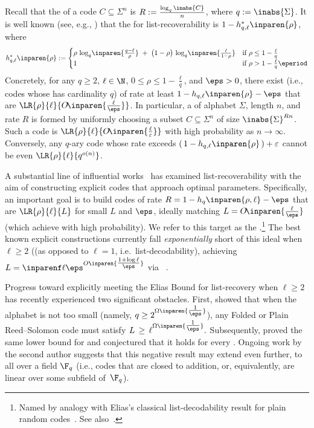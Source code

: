 \documentclass[11pt]{article}
\begin{document}
Recall that the  of a code $C \subseteq \Sigma^n$ is 
$R := \frac{\log_q \inabs{C}}{n}$, where
$q := \inabs{\Sigma}$. It is well known (see, e.g., \cite[Thm.\ 2.4.12]{Resch2020}) that the  for list-recoverability is 
$1 - h^*_{q,\ell}\inparen{\rho}$, where
$$
h^*_{q,\ell}\inparen{\rho}
:= \begin{cases}
\rho\,\log_q\!\inparen{\frac{q-\ell}{\rho}}
\;+\;
\bigl(1-\rho\bigr)\,\log_q\!\inparen{\frac{\ell}{1-\rho}}&\text{if }\rho \le 1-\frac \ell q \\
1 &\text{if }\rho > 1-\frac \ell q\eperiod
\end{cases}
$$
Concretely, for any $q \ge 2$, $\ell \in \N$, $0 \le \rho \le 1-\frac\ell q$, and $\eps > 0$, there exist  (i.e., codes whose  has cardinality $q$) of rate at least $1 - h_{q,\ell}\inparen{\rho} - \eps$ that are $\LR{\rho}{\ell}{O\!\inparen{\tfrac{\ell}{\eps}}}$. In particular, a  of alphabet $\Sigma$, length $n$, and rate $R$ is formed by uniformly choosing a subset $C \subseteq \Sigma^n$ of size $\inabs{\Sigma}^{R n}$. Such a code is $\LR{\rho}{\ell}{O\!\inparen{\tfrac{\ell}{\varepsilon}}}$ with high probability as $n \to \infty$. Conversely, any $q$-ary code whose rate exceeds $(\,1 - h_{q,\ell}\inparen{\rho}\,) + \varepsilon$ cannot be even $\LR{\rho}{\ell}{q^{o(n)}}$.

A substantial line of influential works~\cite{GR2008,GW2013,KRS+2018,LP2020,GLS+2021,GST2023,Tam24} has examined list-recoverability with the aim of constructing explicit codes that approach optimal parameters. Specifically, an important goal is to build codes of rate 
$R = 1 - h_q\inparen{\rho,\ell} - \eps$
that are 
$\LR{\rho}{\ell}{L}$
for small $L$ and $\eps$, ideally matching 
$L = O\!\inparen{\tfrac{\ell}{\eps}}$ 
(which  achieve with high probability). We refer to this target as the .\footnote{Named by analogy with Elias’s classical list-decodability result for plain random codes~\cite{Elias1957}. See also~\cite{MRSY24}.} The best known explicit constructions currently fall \emph{exponentially} short of this ideal when $\ell \ge 2$ ((as opposed to $\ell=1$, i.e.\ list-decodability), achieving 
$L = \inparenf\ell\eps^{O\inparen{\tfrac{1+\log \ell}{\eps}}}$ 
via ~\cite{Tam24}.

Progress toward explicitly meeting the Elias Bound for list-recovery when $\ell \ge 2$ has recently experienced two significant obstacles. First, \cite{CZ24} showed that when the alphabet is not too small (namely, $q \ge 2^{\Omega\inparen{\tfrac{1}{\eps}}}$), any Folded or Plain Reed--Solomon code must satisfy 
$L \,\ge\, \ell^{\Omega\inparen{\tfrac{1}{\eps}}}.$
Subsequently, \cite{LMS2024} proved the same lower bound for  and conjectured that it holds for every . Ongoing work by the second author suggests that this negative result may extend even further, to all  over a field $\F_q$ (i.e., codes that are closed to addition, or, equivalently, are linear over some subfield of~$\F_q$). 
\end{document}
